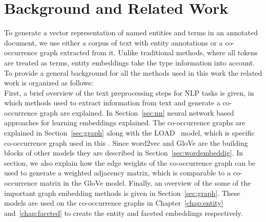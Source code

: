 
\chapter{Background and Related Work}\label{chap:background}
To generate a vector representation of named entities and terms in an annotated document, we use either a corpus of text with entity annotations or a co-occurrence graph extracted from it. Unlike traditional methods, where all tokens are treated as terms, entity embeddings take the type information into account. To provide a general background for all the methods used in this work the related work is organized as follows:\\
First, a brief overview of the text preprocessing steps for NLP tasks is given, in which methods used to extract information from text and generate a co-occurrence graph are explained. In Section~\ref{sec:nn} neural network based approaches for learning embeddings  explained. The co-occurrence graphs are explained in Section~\ref{sec:graph} along with the LOAD~ model, which is  specific co-occurrence graph used in this .  Since word2vec and GloVe are the building blocks of other models they are described in Section~\ref{sec:wordembeddig}. In  section, we also explain how the edge weights of the co-occurrence graph can be used to generate a weighted adjacency matrix, which is comparable to a co-occurrence matrix in the GloVe model.  Finally, an overview of the some of the important graph embedding methods is given in Section~\ref{sec:graph}. These models are used on the co-occurrence graphs in Chapter~\ref{chap:entity} and~\ref{chap:faceted} to create the entity and faceted embeddings respectively. 


